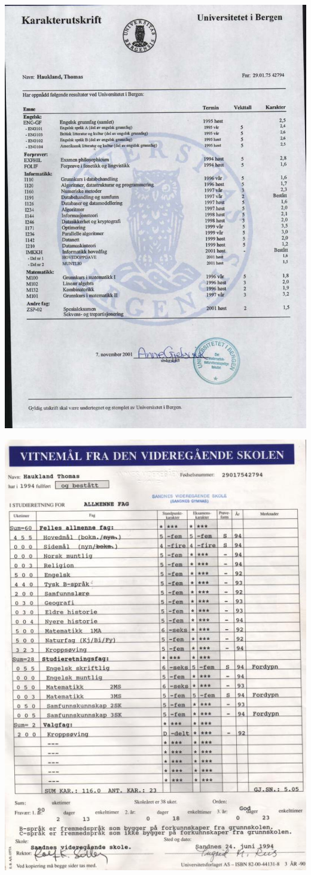 \documentclass[10pt]{article}
\begin{document}
\includegraphics[width=\textwidth]{"grades"} 




\includegraphics[width=\textwidth]{"grades-highschool"} 
\end{document}
